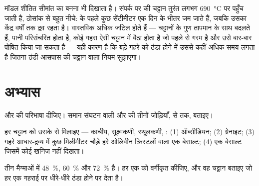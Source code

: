 मॉडल शीतित सीमांत का बनना भी दिखाता है। संपर्क पर की चट्टान
तुरंत लगभग \qty{690}{\degreeCelsius} पर पहुँच जाती है, ठोसांक से बहुत नीचे:
 के पहले कुछ सेंटीमीटर एक दिन के भीतर जम जाते हैं, जबकि उसका केंद्र
वर्षों तक द्रव रहता है। वास्तविक  अधिक जटिल होते हैं --- चट्टानों के
गुण तापमान के साथ बदलते हैं, पानी परिसंचरित होता है, कोई गहरा  ऐसी चट्टान में बैठा होता है
जो पहले से गरम है और उसे बार-बार पोषित किया जा सकता है --- यही कारण है कि बड़े
गहरे  को ठंडा होने में उससे कहीं अधिक समय लगता है जितना ठंडी आसपास की चट्टान वाला नियम
सुझाएगा।

\section{अभ्यास}

\begin{exercise}[$\star$]\label{exo:g11:igneous-rocks:1}
 और  की परिभाषा दीजिए। समान संघटन वाली 
और  की तीनों जोड़ियाँ,  से  तक, बताइए।
\end{exercise}

\begin{exercise}[$\star$]\label{exo:g11:igneous-rocks:2}
हर चट्टान को उसके  से मिलाइए --- काचीय, सूक्ष्मकणी, स्थूलकणी,
: (1) ऑब्सीडियन; (2) ग्रेनाइट; (3) गहरे आधार-द्रव्य में कुछ मिलीमीटर चौड़े हरे ओलिवीन
क्रिस्टलों वाला एक बेसाल्ट; (4) एक बेसाल्ट जिसमें
कोई खनिज नहीं दिखता।
\end{exercise}

\begin{exercise}[$\star$]\label{exo:g11:igneous-rocks:3}
तीन मैग्माओं में \qty{48}{\percent}, \qty{60}{\percent} और
\qty{72}{\percent}  है। हर एक को वर्गीकृत कीजिए, और वह चट्टान बताइए जो हर एक
गहराई पर धीरे-धीरे ठंडा होने पर देता है।
\end{exercise}

